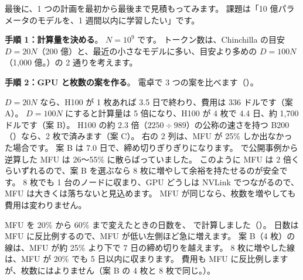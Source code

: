 最後に、1 つの計画を最初から最後まで見積もってみます。
課題は「10 億パラメータのモデルを、1 週間以内に学習したい」です。

\textbf{手順 1：計算量を決める}。
$N=10^{9}$ です。
トークン数は、Chinchilla の目安 $D=20N$（200 億）と、最近の小さなモデルに多い、目安より多めの $D=100N$（1,000 億。）の 2 通りを考えます。

\textbf{手順 2：GPU と枚数の案を作る}。
電卓で 3 つの案を比べます（）。

\par{}\relax\ifdim\pagetotal<\pagegoal\ifdim\dimexpr\pagegoal-\pagetotal\relax<13\baselineskip\relax\newpage\fi\fi
{}


$D=20N$ なら、H100 が 1 枚あれば 3.5 日で終わり、費用は 336 ドルです（案 A）。
$D=100N$ にすると計算量は 5 倍になり、H100 が 4 枚で 4.4 日、約 1,700 ドルです（案 B）。
H100 の約 2.3 倍（$2250\div989$）の公称の速さを持つ B200（）なら、2 枚で済みます（案 C）。
右の 2 列は、MFU が 25\% しか出なかった場合です。
案 B は 7.0 日で、締め切りぎりぎりになります。
で公開事例から逆算した MFU は 26〜55\% に散らばっていました。
このように MFU は 2 倍くらいずれるので、案 B を選ぶなら 8 枚に増やして余裕を持たせるのが安全です。
8 枚でも 1 台のノードに収まり、GPU どうしは NVLink でつながるので、MFU は大きくは落ちないと見込めます。
MFU が同じなら、枚数を増やしても費用は変わりません。

MFU を 20\% から 60\% まで変えたときの日数を、 で計算しました（）。
日数は MFU に反比例するので、MFU が低い左側ほど急に増えます。
案 B（4 枚）の線は、MFU が約 25\% より下で 7 日の締め切りを越えます。
8 枚に増やした線は、MFU が 20\% でも 5 日以内に収まります。
費用も MFU に反比例しますが、枚数にはよりません（案 B の 4 枚と 8 枚で同じ。）。

